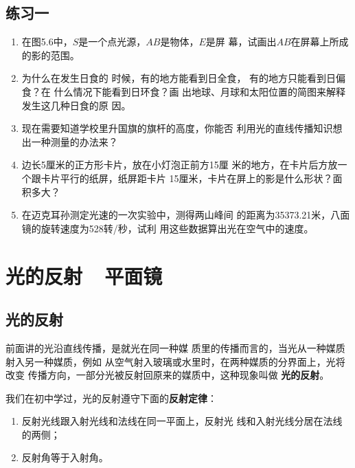 \subsection*{练习一}
\begin{enumerate}
    \item 在图5.6中，$S$是一个点光源，$AB$是物体，$E$是屏
幕，试画出$AB$在屏幕上所成
的影的范围。
\begin{figure}[htp]
	\centering
{}
	\caption{}
\end{figure}


\item 为什么在发生日食的
时候，有的地方能看到日全食，
有的地方只能看到日偏食？在
什么情况下能看到日环食？画
出地球、月球和太阳位置的简图来解释发生这几种日食的原
因。
\item 现在需要知道学校里升国旗的旗杆的高度，你能否
利用光的直线传播知识想出一种测量的办法来？
\item 边长5厘米的正方形卡片，放在小灯泡正前方15厘
米的地方，在卡片后方放一个跟卡片平行的纸屏，纸屏距卡片
15厘米，卡片在屏上的影是什么形状？面积多大？
\item 在迈克耳孙测定光速的一次实验中，测得两山峰间
的距离为35373.21米，八面镜的旋转速度为528转/秒，试利
用这些数据算出光在空气中的速度。
\end{enumerate}

\section{光的反射~~平面镜}
\subsection{光的反射}
前面讲的光沿直线传播，是就光在同一种媒
质里的传播而言的，当光从一种媒质射入另一种媒质，例如
从空气射入玻璃或水里时，在两种媒质的分界面上，光将改变
传播方向，一部分光被反射回原来的媒质中，这种现象叫做
\textbf{光的反射}。

我们在初中学过，光的反射遵守下面的\textbf{反射定律}：

\begin{enumerate}
    \item 反射光线跟入射光线和法线在同一平面上，反射光
线和入射光线分居在法线的两侧；
\item 反射角等于入射角。
\end{enumerate}

